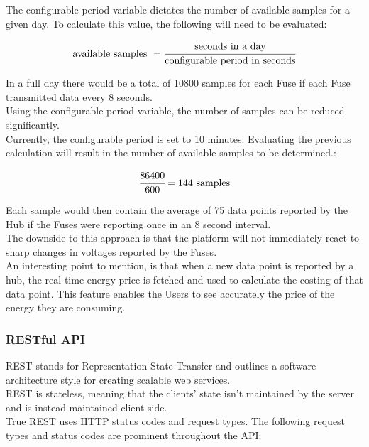 \documentclass[preprint,12pt,3p]{elsarticle}
\begin{document}
The configurable period variable dictates the number of available samples for a given day. To calculate this value, the following will need to be evaluated:

\begin{equation*} 
\text{available samples } = \cfrac{\text{seconds in a day}}{\text{configurable period in seconds}}
\end{equation*}

In a full day there would be a total of 10800 samples for each Fuse if each Fuse transmitted data every 8 seconds.\\
Using the configurable period variable, the number of samples can be reduced significantly.\\
Currently, the configurable period is set to 10 minutes. Evaluating the previous calculation will result in the number of available samples to be determined.:

\begin{equation*} 
 \cfrac{86400}{\text{600}} = 144 \text{ samples}
\end{equation*}

Each sample would then contain the average of 75 data points reported by the Hub if the Fuses were reporting once in an 8 second interval.\\
The downside to this approach is that the platform will not immediately react to sharp changes in voltages reported by the Fuses. \\
An interesting point to mention, is that when a new data point is reported by a hub, the real time energy price is fetched and used to calculate the costing of that data point. This feature enables the Users to see accurately the price of the energy they are consuming. 

\subsubsection{RESTful API}

REST stands for Representation State Transfer and outlines a software architecture style for creating scalable web services.\\
REST is stateless, meaning that the clients' state isn't maintained by the server and is instead maintained client side.\\
True REST uses HTTP status codes and request types. The following request types and status codes are prominent throughout the API:\\
\end{document}
